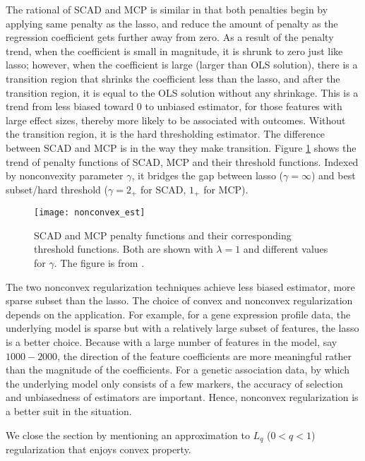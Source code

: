 The rational of SCAD and MCP is similar in that both penalties begin by applying same penalty as the lasso, and reduce the amount of penalty as the regression coefficient gets further away from zero. As a result of the penalty trend, when the coefficient is small in magnitude, it is shrunk to zero just like lasso; however, when the coefficient is large (larger than OLS solution), there is a transition region that shrinks the coefficient less than the lasso, and after the transition region, it is equal to the OLS solution without any shrinkage. This is a trend from less biased toward 0 to unbiased estimator, for those features with large effect sizes, thereby more likely to be associated with outcomes. Without the transition region, it is the hard thresholding estimator. The difference between SCAD and MCP is in the way they make transition. Figure \ref{fig:nonconvex_est} shows the trend of penalty functions of SCAD, MCP and their threshold functions. Indexed by nonconvexity parameter $\gamma$, it bridges the gap between lasso ($\gamma=\infty$) and best subset/hard threshold ($\gamma=2_+$ for SCAD, $1_+$ for MCP).   
\begin{figure}[tbh]
  \centering
  \texttt{[image: nonconvex\_est]}
  \caption[SCAD and MCP penalty functions and their corresponding threshold functions] {
    SCAD and MCP penalty functions and their corresponding threshold functions. Both are shown with $\lambda=1$ and different values for $\gamma$. The figure is from \cite{mazumder2011sparsenet}. 
  }
  \label{fig:nonconvex_est}
\end{figure}

The two nonconvex regularization techniques achieve less biased estimator, more sparse subset than the lasso. The choice of convex and nonconvex regularization depends on the application. For example, for a gene expression profile data, the underlying model is sparse but with a relatively large subset of features, the lasso is a better choice. Because with a large number of features in the model, say $1000-2000$, the direction of the feature coefficients are more meaningful rather than the magnitude of the coefficients. For a genetic association data, by which the underlying model only consists of a few markers, the accuracy of selection and unbiasedness of estimators are important. Hence, nonconvex regularization is a better suit in the situation.

We close the section by mentioning an approximation to $L_q$ ($0<q<1$) regularization that enjoys convex property.

